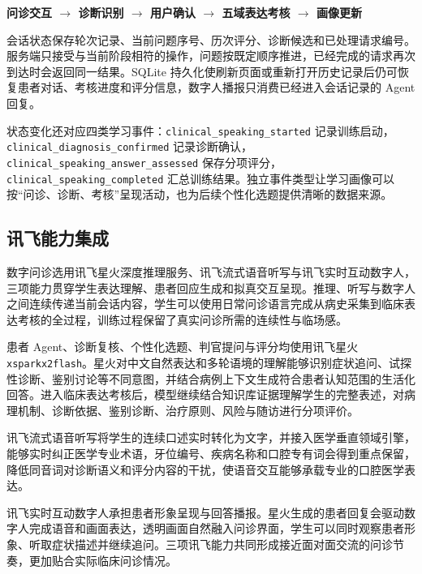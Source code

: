 \begin{center}
  \textbf{问诊交互 $\rightarrow$ 诊断识别 $\rightarrow$ 用户确认 $\rightarrow$ 五域表达考核 $\rightarrow$ 画像更新}
\end{center}

会话状态保存轮次记录、当前问题序号、历次评分、诊断候选和已处理请求编号。服务端只接受与当前阶段相符的操作，问题按既定顺序推进，已经完成的请求再次到达时会返回同一结果。SQLite 持久化使刷新页面或重新打开历史记录后仍可恢复患者对话、考核进度和评分信息，数字人播报只消费已经进入会话记录的 Agent 回复。

状态变化还对应四类学习事件：\texttt{clinical\_speaking\_started} 记录训练启动，\texttt{clinical\_diagnosis\_confirmed} 记录诊断确认，\texttt{clinical\_speaking\_answer\_assessed} 保存分项评分，\texttt{clinical\_speaking\_completed} 汇总训练结果。独立事件类型让学习画像可以按“问诊、诊断、考核”呈现活动，也为后续个性化选题提供清晰的数据来源。

\subsection{讯飞能力集成}

数字问诊选用讯飞星火深度推理服务、讯飞流式语音听写与讯飞实时互动数字人，三项能力贯穿学生表达理解、患者回应生成和拟真交互呈现。推理、听写与数字人之间连续传递当前会话内容，学生可以使用日常问诊语言完成从病史采集到临床表达考核的全过程，训练过程保留了真实问诊所需的连续性与临场感。

患者 Agent、诊断复核、个性化选题、判官提问与评分均使用讯飞星火 \texttt{xsparkx2flash}。星火对中文自然表达和多轮语境的理解能够识别症状追问、试探性诊断、鉴别讨论等不同意图，并结合病例上下文生成符合患者认知范围的生活化回答。进入临床表达考核后，模型继续结合知识库证据理解学生的完整表述，对病理机制、诊断依据、鉴别诊断、治疗原则、风险与随访进行分项评价。

讯飞流式语音听写将学生的连续口述实时转化为文字，并接入医学垂直领域引擎，能够实时纠正医学专业术语，牙位编号、疾病名称和口腔专有词会得到重点保留，降低同音词对诊断语义和评分内容的干扰，使语音交互能够承载专业的口腔医学表达。

讯飞实时互动数字人承担患者形象呈现与回答播报。星火生成的患者回复会驱动数字人完成语音和画面表达，透明画面自然融入问诊界面，学生可以同时观察患者形象、听取症状描述并继续追问。三项讯飞能力共同形成接近面对面交流的问诊节奏，更加贴合实际临床问诊情况。

